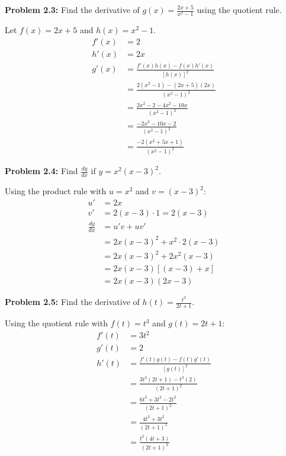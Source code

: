 \documentclass[12pt,a4paper]{book}
\theoremstyle{definition}
\begin{document}
\begin{solution}
\textbf{Problem 2.3:} Find the derivative of $g(x) = \frac{2x + 5}{x^2 - 1}$ using the quotient rule.

Let $f(x) = 2x + 5$ and $h(x) = x^2 - 1$.
\begin{align}
f'(x) &= 2\\
h'(x) &= 2x\\
g'(x) &= \frac{f'(x)h(x) - f(x)h'(x)}{[h(x)]^2}\\
&= \frac{2(x^2 - 1) - (2x + 5)(2x)}{(x^2 - 1)^2}\\
&= \frac{2x^2 - 2 - 4x^2 - 10x}{(x^2 - 1)^2}\\
&= \frac{-2x^2 - 10x - 2}{(x^2 - 1)^2}\\
&= \frac{-2(x^2 + 5x + 1)}{(x^2 - 1)^2}
\end{align}
\end{solution}

\begin{solution}
\textbf{Problem 2.4:} Find $\frac{dy}{dx}$ if $y = x^2(x - 3)^2$.

Using the product rule with $u = x^2$ and $v = (x - 3)^2$:
\begin{align}
u' &= 2x\\
v' &= 2(x - 3) \cdot 1 = 2(x - 3)\\
\frac{dy}{dx} &= u'v + uv'\\
&= 2x(x - 3)^2 + x^2 \cdot 2(x - 3)\\
&= 2x(x - 3)^2 + 2x^2(x - 3)\\
&= 2x(x - 3)[(x - 3) + x]\\
&= 2x(x - 3)(2x - 3)
\end{align}
\end{solution}

\begin{solution}
\textbf{Problem 2.5:} Find the derivative of $h(t) = \frac{t^3}{2t + 1}$.

Using the quotient rule with $f(t) = t^3$ and $g(t) = 2t + 1$:
\begin{align}
f'(t) &= 3t^2\\
g'(t) &= 2\\
h'(t) &= \frac{f'(t)g(t) - f(t)g'(t)}{[g(t)]^2}\\
&= \frac{3t^2(2t + 1) - t^3(2)}{(2t + 1)^2}\\
&= \frac{6t^3 + 3t^2 - 2t^3}{(2t + 1)^2}\\
&= \frac{4t^3 + 3t^2}{(2t + 1)^2}\\
&= \frac{t^2(4t + 3)}{(2t + 1)^2}
\end{align}
\end{solution}
\end{document}
